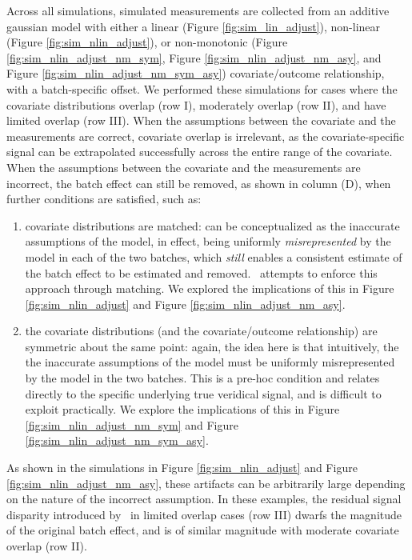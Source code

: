 {{{{Across all simulations, simulated measurements are collected from an additive gaussian model with either a linear (Figure \ref{fig:sim_lin_adjust}), non-linear (Figure \ref{fig:sim_nlin_adjust}), or non-monotonic (Figure \ref{fig:sim_nlin_adjust_nm_sym}, Figure \ref{fig:sim_nlin_adjust_nm_asy}, and Figure \ref{fig:sim_nlin_adjust_nm_sym_asy}) covariate/outcome relationship, with a batch-specific offset. We performed these simulations for cases where the covariate distributions overlap (row I), moderately overlap (row II), and have limited overlap (row III). When the assumptions between the covariate and the measurements are correct, covariate overlap is irrelevant, as the covariate-specific signal can be extrapolated successfully across the entire range of the covariate. When the assumptions between the covariate and the measurements are incorrect, the batch effect can still be removed, as shown in column (D), when further conditions are satisfied, such as:
\begin{enumerate}[leftmargin=*]
    \item covariate distributions are matched: can be conceptualized as the inaccurate assumptions of the model, in effect, being uniformly \textit{misrepresented} by the model in each of the two batches, which \textit{still} enables a consistent estimate of the batch effect to be estimated and removed. \cccombat~attempts to enforce this approach through matching. We explored the implications of this in Figure \ref{fig:sim_nlin_adjust} and Figure \ref{fig:sim_nlin_adjust_nm_asy}.
    \item the covariate distributions (and the covariate/outcome relationship) are symmetric about the same point: again, the idea here is that intuitively, the the inaccurate assumptions of the model must be uniformly misrepresented by the model in the two batches. This is a pre-hoc condition and relates directly to the specific underlying true veridical signal, and is difficult to exploit practically. We explore the implications of this in Figure \ref{fig:sim_nlin_adjust_nm_sym} and Figure \ref{fig:sim_nlin_adjust_nm_sym_asy}.
\end{enumerate}

As shown in the simulations in Figure \ref{fig:sim_nlin_adjust} and Figure \ref{fig:sim_nlin_adjust_nm_asy}, these artifacts can be arbitrarily large depending on the nature of the incorrect assumption. In these examples, the residual signal disparity introduced by \ccombat~in limited overlap cases (row III) dwarfs the magnitude of the original batch effect, and is of similar magnitude with moderate covariate overlap (row II). 

}}}}
